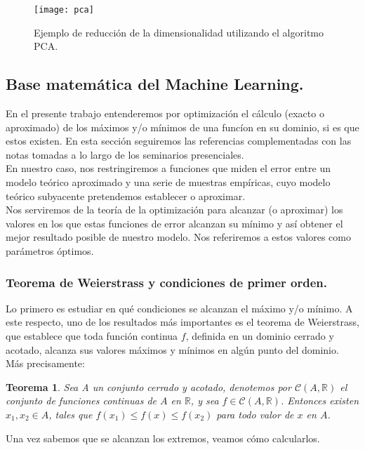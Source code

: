 \documentclass[a4paper,11pt]{article}
\newtheorem{theorem}{Teorema}
\begin{document}
\begin{figure}[H]
\centering
\texttt{[image: pca]}
\caption{Ejemplo de reducción de la dimensionalidad utilizando el algoritmo PCA.}
\end{figure}

\subsection{ Base matemática del Machine Learning.}
\label{}

En el presente trabajo entenderemos por optimización el cálculo (exacto o
aproximado) de los máximos y/o mínimos de una funcíon en su dominio, si es
que estos existen. En esta sección seguiremos las referencias \cite{cálculo} \cite{cálculo2} complementadas con las notas tomadas a lo largo de los seminarios presenciales.\\

\noindent
En nuestro caso, nos restringiremos a funciones que miden el error entre
un modelo teórico aproximado y una serie de muestras empíricas, cuyo modelo
teórico subyacente pretendemos establecer o aproximar.\\

\noindent
Nos serviremos de la teoría de la optimización para alcanzar (o aproximar) los valores en los que estas funciones de error alcanzan su mínimo y así obtener el mejor resultado posible de nuestro modelo. Nos referiremos a estos valores como parámetros óptimos.
\subsubsection{Teorema
de Weierstrass y condiciones de primer orden.}
Lo primero es estudiar en qué condiciones se alcanzan el máximo y/o mínimo.
A este respecto, uno de los resultados más importantes es el teorema de Weierstrass, que establece que toda función continua $f$, definida en un dominio cerrado
y acotado, alcanza sus valores máximos y mínimos en algún punto del dominio.
Más precisamente:
\begin{theorem}
Sea A un conjunto cerrado y acotado, denotemos por $\mathcal{C}(A,\mathbb{R})$  el conjunto de funciones continuas de $A$ en $\mathbb{R}$, y sea $f\in\mathcal{C}(A,\mathbb{R})$. Entonces existen $ x_{1},x_{2} \in A$, tales que $ f(x_{1}) \leq f(x) \leq f(x_{2})$ para todo valor de $x$ en $A$.
\end{theorem}
\noindent
Una vez sabemos que se alcanzan los extremos, veamos cómo calcularlos.
\\
\end{document}
